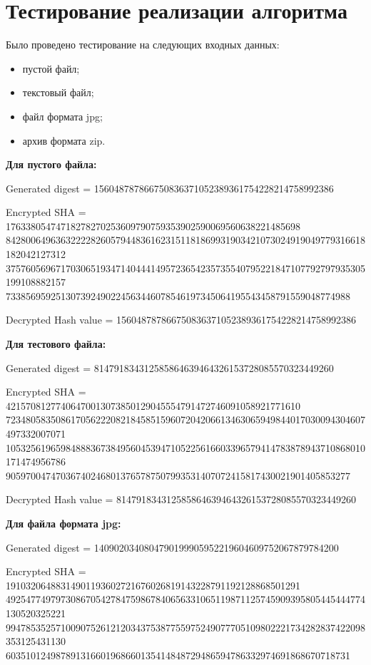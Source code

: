 \section{Тестирование реализации алгоритма}

Было проведено тестирование на следующих входных данных:

\begin{itemize}
	\item пустой файл;
	\item текстовый файл;
	\item файл формата jpg;
	\item архив формата zip.
\end{itemize}

\textbf{Для пустого файла:}

Generated digest = 156048787866750836371052389361754228214758992386

Encrypted SHA = 17633805474718278270253609790759353902590069560638221485698\\842800649636322228260579448361623151181869931903421073024919049779316618182042127312\\375760569671703065193471404441495723654235735540795221847107792797935305199108882157\\733856959251307392490224563446078546197345064195543458791559048774988

Decrypted Hash value = 156048787866750836371052389361754228214758992386

\textbf{Для тестового файла:}

Generated digest = 814791834312585864639464326153728085570323449260

Encrypted SHA = 42157081277406470013073850129045554791472746091058921771610\\723480583508617056222082184585159607204206613463065949844017030094304607497332007071\\105325619659848883673849560453947105225616603396579414783878943710868010171474956786\\905970047470367402468013765787507993531407072415817430021901405853277

Decrypted Hash value = 814791834312585864639464326153728085570323449260

\textbf{Для файла формата jpg:}

Generated digest = 1409020340804790199905952219604609752067879784200

Encrypted SHA = 19103206488314901193602721676026819143228791192128868501291\\492547749797308670542784759867840656331065119871125745909395805445444774130520325221\\994785352571009075261212034375387755975249077705109802221734282837422098353125431130\\603510124987891316601968660135414848729486594786332974691868670718731

